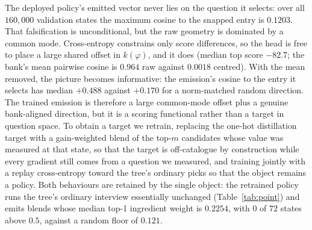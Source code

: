 \documentclass[11pt]{article}
\begin{document}
The deployed policy's emitted vector never lies on the question it selects: over all $160{,}000$
validation states the maximum cosine to the snapped entry is $0.1203$. That falsification is
unconditional, but the raw geometry is dominated by a common mode. Cross-entropy constrains only score
differences, so the head is free to place a large shared offset in $k(\varphi)$, and it does (median
top score $-82.7$; the bank's mean pairwise cosine is $0.964$ raw against $0.0018$ centred). With the
mean removed, the picture becomes informative: the emission's cosine to the entry it selects has
median $+0.488$ against $+0.170$ for a norm-matched random direction. The trained emission is
therefore a large common-mode offset plus a genuine bank-aligned direction, but it is a scoring
functional rather than a target in question space. To obtain a target we retrain, replacing the
one-hot distillation target with a gain-weighted blend of the top-$m$ candidates whose value was
measured at that state, so that the target is off-catalogue by construction while every gradient still
comes from a question we measured, and training jointly with a replay cross-entropy toward the tree's
ordinary picks so that the object remains a policy. Both behaviours are retained by the single object:
the retrained policy runs the tree's ordinary interview essentially unchanged (Table~\ref{tab:point})
and emits blends whose median top-1 ingredient weight is $0.2254$, with $0$ of $72$ states above
$0.5$, against a random floor of $0.121$.
\end{document}
